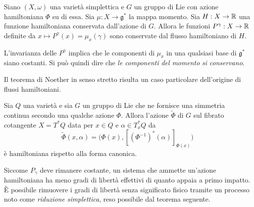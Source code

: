 \begin{theorem}
  Siano $(X,\omega)$ una varietà simplettica e $G$ un gruppo di Lie con azione hamiltoniana $\Phi$ su di essa. Sia $\mu: X\to \mathfrak{g}^*$ la mappa momento. Sia $H: X\to \mathbb{R}$ una funzione hamiltoniana conservata dall'azione di $G$. Allora le funzioni $P^{\gamma}: X\to \mathbb{R}$ definite da $x \mapsto P^{\gamma}(x) = \mu_x(\gamma)$ sono conservate dal flusso hamiltoniano di $H$.
\end{theorem}
\begin{remark}
  L'invarianza delle $P^{\gamma}$ implica che le componenti di $\mu_x$ in una qualsiasi base di $\mathfrak{g}^*$ siano costanti. Si può quindi dire che \emph{le componenti del momento si conservano}. 
\end{remark}

Il teorema di Noether in senso stretto risulta un caso particolare dell'origine di flussi hamiltoniani.
\begin{theorem}
  Sia $Q$ una varietà e sia $G$ un gruppo di Lie che ne fornisce una simmetria continua secondo una qualche azione $\Phi$. Allora l'azione $\tilde{\Phi}$ di $G$ sul fibrato cotangente $X=T^*Q$ data per $x \in Q$ e $\alpha \in T^*_x Q$ da
  \begin{equation*}
  \tilde{\Phi}(x,\alpha) = \big(\Phi(x), [(\Phi^{-1})^*(\alpha)]_{\Phi(x)}\big)
  \end{equation*} 
  è hamiltoniana rispetto alla forma canonica.
\end{theorem}

Siccome $P_\gamma$ deve rimanere costante, un sistema che ammette un'azione hamiltoniana ha meno gradi di libertà effettivi di quanto appaia a primo impatto. È possibile rimuovere i gradi di libertà senza significato fisico tramite un processo noto come \emph{riduzione simplettica}, reso possibile dal teorema seguente.

